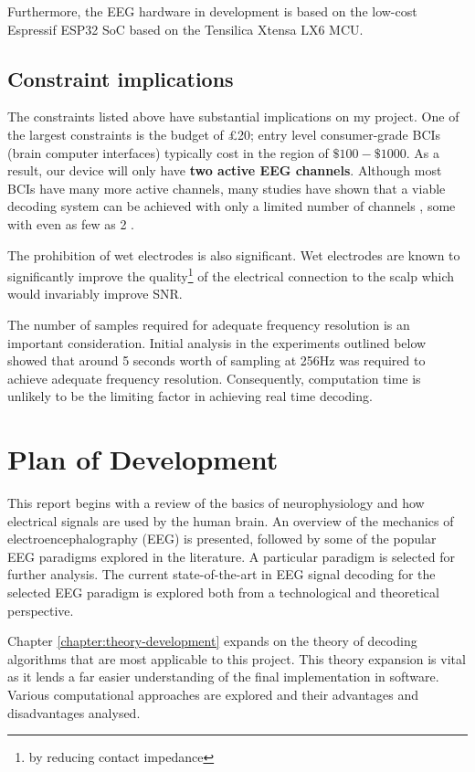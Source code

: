 Furthermore, the EEG hardware in development is based on the low-cost Espressif ESP32 SoC based on the Tensilica Xtensa LX6 MCU. 

\subsection{Constraint implications}
The constraints listed above have substantial implications on my project. One of the largest constraints is the budget of £20; entry level consumer-grade BCIs (brain computer interfaces) typically cost in the region of $\$100-\$1000$. As a result, our device will only have \textbf{two active EEG channels}. Although most BCIs have many more active channels, many studies have shown that a viable decoding system can be achieved with only a limited number of channels \cite{Wang2011}, some with even as few as 2 \cite{Acampora2021}. 

The prohibition of wet electrodes is also significant. Wet electrodes are known to significantly improve the quality\footnote{by reducing contact impedance} of the electrical connection to the scalp which would invariably improve SNR. 

The number of samples required for adequate frequency resolution is an important consideration. Initial analysis in the experiments outlined below showed that around 5 seconds worth of sampling at 256Hz was required to achieve adequate frequency resolution. Consequently, computation time is unlikely to be the limiting factor in achieving real time decoding.

\section{Plan of Development}
This report begins with a review of the basics of neurophysiology and how electrical signals are used by the human brain. An overview of the mechanics of electroencephalography (EEG) is presented, followed by some of the popular EEG paradigms explored in the literature. A particular paradigm is selected for further analysis. The current state-of-the-art in EEG signal decoding for the selected EEG paradigm is explored both from a technological and theoretical perspective. 

Chapter \ref{chapter:theory-development} expands on the theory of decoding algorithms that are most applicable to this project. This theory expansion is vital as it lends a far easier understanding of the final implementation in software. Various computational approaches are explored and their advantages and disadvantages analysed. 


